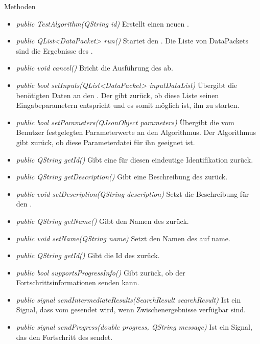 Methoden
\begin{itemize}
\item\textit{public TestAlgorithm(QString id)} Erstellt einen neuen .
\item\textit{public QList<DataPacket> run()} Startet den . Die Liste von DataPackets sind die Ergebnisse des .
\item\textit{public void cancel()} Bricht die Ausführung des  ab.
\item\textit{public bool setInputs(QList<DataPacket> inputDataList)} Übergibt die benötigten Daten an den . Der  gibt zurück, ob diese Liste seinen Eingabeparametern entspricht und es somit möglich ist, ihn zu starten.
\item\textit{public bool setParameters(QJsonObject parameters)} Übergibt die vom Benutzer festgelegten Parameterwerte an den Algorithmus. Der Algorithmus gibt zurück, ob diese Parameterdatei für ihn geeignet ist.
\item\textit{public QString getId()} Gibt eine für diesen  eindeutige Identifikation zurück.
\item\textit{public QString getDescription()} Gibt eine Beschreibung des  zurück.
\item\textit{public void setDescription(QString description)} Setzt die Beschreibung für den .
\item\textit{public QString getName()} Gibt den Namen des  zurück.
\item\textit{public void setName(QString name)} Setzt den Namen des  auf name.
\item\textit{public QString getId()} Gibt die Id des  zurück.
\item\textit{public bool supportsProgressInfo()} Gibt zurück, ob der  Fortschrittsinformationen senden kann.
\item\textit{public signal sendIntermediateResults(SearchResult searchResult)} Ist ein Signal, dass vom  gesendet wird, wenn Zwischenergebnisse verfügbar sind.
\item\textit{public signal sendProgress(double progress, QString message)} Ist ein Signal, das den Fortschritt des  sendet.
\end{itemize}


